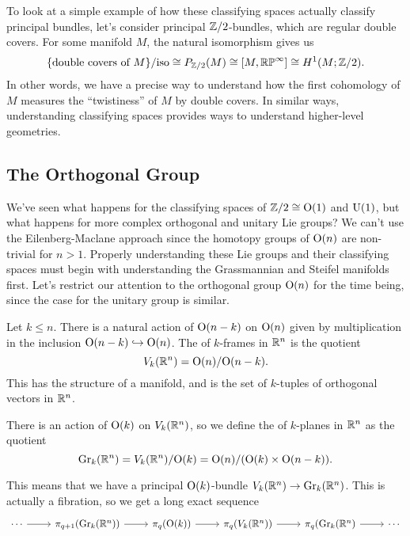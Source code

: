 \documentclass{article}
\begin{document}
To look at a simple example of how these classifying spaces actually classify principal bundles, let's consider principal $\mathbb{Z}/2$-bundles, which are regular double covers. For some manifold $M$, the natural isomorphism gives us 
\[
  \{\textrm{double covers of }M\}/\textrm{iso}\cong P_{\mathbb{Z}/2}(M) \cong [M, \mathbb{RP}^\infty] \cong H^1(M; \mathbb{Z}/2).
\]
In other words, we have a precise way to understand how the first cohomology of $M$ measures the ``twistiness'' of $M$ by double covers. In similar ways, understanding classifying spaces provides ways to understand higher-level geometries.

\subsection{The Orthogonal Group}

We've seen what happens for the classifying spaces of $\mathbb{Z}/2\cong \mathrm{O}(1)$ and $\mathrm{U}(1)$, but what happens for more complex orthogonal and unitary Lie groups? We can't use the Eilenberg-Maclane approach since the homotopy groups of $\mathrm{O}(n)$ are non-trivial for $n>1$. Properly understanding these Lie groups and their classifying spaces must begin with understanding the Grassmannian and Steifel manifolds first. Let's restrict our attention to the orthogonal group $\mathrm{O}(n)$ for the time being, since the case for the unitary group is similar.

\begin{definition}
  Let $k\leq n$. There is a natural action of $\mathrm{O}(n-k)$ on $\mathrm{O}(n)$ given by multiplication in the inclusion $\mathrm{O}(n-k) \hookrightarrow \mathrm{O}(n)$. The  of $k$-frames in $\mathbb{R}^n$ is the quotient
  \[
    V_k(\mathbb{R}^n) = \mathrm{O}(n)/\mathrm{O}(n-k).
  \]
  This has the structure of a manifold, and is the set of $k$-tuples of orthogonal vectors in $\mathbb{R}^n$.
\end{definition}

\begin{definition}
  There is an action of $\mathrm{O}(k)$ on $V_k(\mathbb{R}^n)$, so we define the  of $k$-planes in $\mathbb{R}^n$ as the quotient
  \[
    \mathrm{Gr}_k(\mathbb{R}^n) = V_k(\mathbb{R}^n)/\mathrm{O}(k) = \mathrm{O}(n)/(\mathrm{O}(k)\times \mathrm{O}(n-k)).
  \]
\end{definition}

This means that we have a principal $\mathrm{O}(k)$-bundle $V_k(\mathbb{R}^n) \to \mathrm{Gr}_k(\mathbb{R}^n)$. This is actually a fibration, so we get a long exact sequence 
\[\begin{tikzcd}
	\cdots & {\pi_{q+1}(\Gr_k(\R^n))} & {\pi_q(\O(k))} & {\pi_q(V_k(\R^n))} & {\pi_q(\Gr_k(\R^n)} & \cdots
	\arrow[from=1-4, to=1-5]
	\arrow[from=1-3, to=1-4]
	\arrow[from=1-5, to=1-6]
	\arrow[from=1-2, to=1-3]
	\arrow[from=1-1, to=1-2]
\end{tikzcd}\]
\end{document}
